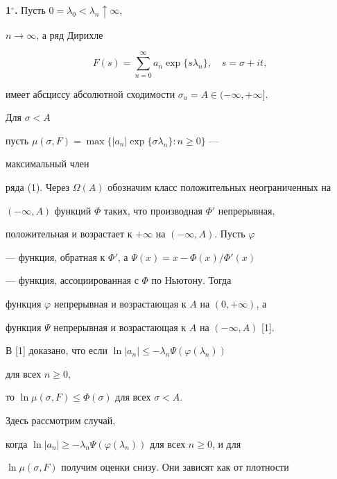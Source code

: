 




\maketitle


\label{begin}





{\bf 1${}^\circ$.} Пусть $0=\lambda_0<\lambda_n\uparrow \infty$,


$n\to \infty$, а ряд Дирихле


\begin{equation}


F(s)=\sum_{n=0}^{\infty}a_n\exp\{s\lambda_n\},\quad s=\sigma+it,


\end{equation}


имеет абсциссу абсолютной сходимости $\sigma_a=A\in(-\infty,+\infty]$.


Для $\sigma<A$ 


пусть $\mu(\sigma,F)=\max\{|a_n|\exp\{\sigma\lambda_n\}:n\ge 0\}$ ---


максимальный член 


ряда (1). Через $\Omega(A)$ обозначим класс положительных неограниченных на 


$(-\infty,A)$ функций $\Phi$ таких, что производная $\Phi'$ непрерывная, 


положительная и возрастает к $+\infty$ на $(-\infty,A)$. Пусть $\varphi$


--- функция, обратная к $\Phi'$, а $\Psi(x)=x-\Phi(x)/\Phi'(x)$


--- функция, ассоциированная с $\Phi$ по Ньютону. Тогда


функция $\varphi$ непрерывная и возрастающая к $A$ на $(0,+\infty)$, а 


функция $\Psi$ непрерывная и возрастающая к $A$ на $(-\infty,A)$ [1]. 


В [1] доказано, что если $\ln |a_n|\le-\lambda_n\Psi(\varphi(\lambda_n))$


для всех $n\ge 0$, 


то $\ln\mu(\sigma,F)\le\Phi(\sigma)$ для всех $\sigma<A$.


Здесь рассмотрим случай,


когда $\ln|a_n|\ge-\lambda_n\Psi(\varphi(\lambda_n))$ для всех $n\ge 0$, и для


$\ln \mu(\sigma,F)$ получим оценки снизу. Они зависят как от плотности 



